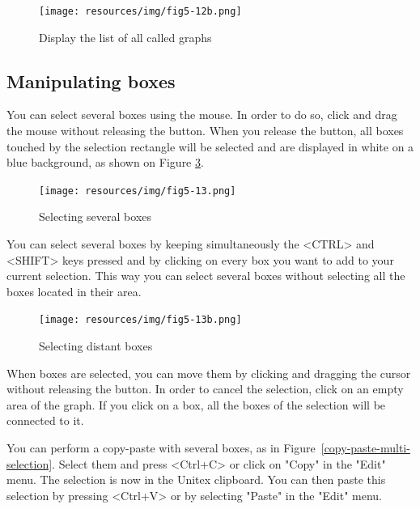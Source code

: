 \begin{figure}[!ht]
\begin{center}
\texttt{[image: resources/img/fig5-12b.png]}
\caption{Display the list of all called graphs\label{list-called-graphs}}
\end{center}
\end{figure}

\subsection{Manipulating boxes}
\label{boxes-selection}

You can select several boxes using the mouse. In order to do so, click and drag the
mouse without releasing the button. When you release the button, all boxes
touched by the selection rectangle will be selected and are displayed in
white on a blue background, as shown on Figure \ref{multi-selection}.

\begin{figure}[!ht]
\begin{center}
\texttt{[image: resources/img/fig5-13.png]}
\caption{Selecting several boxes\label{multi-selection}}
\end{center}
\end{figure}
\noindent You can select several boxes by keeping simultaneously the <CTRL> and <SHIFT> keys pressed and by clicking on every box you want to add to your current selection. This way you can select several boxes without selecting all the boxes located in their area.

\begin{figure}[!ht]
\begin{center}
\texttt{[image: resources/img/fig5-13b.png]}
\caption{Selecting distant boxes\label{multi-selection}}
\end{center}
\end{figure}
\bigskip
\noindent When boxes are selected, you can move them by clicking and
dragging the cursor without releasing the button. In order to cancel the selection, click on
an empty area of the graph. If you click on a box, all the boxes of the selection
will be connected to it.

\bigskip
{}
\noindent You can perform a copy-paste with several boxes, as in
Figure~\ref{copy-paste-multi-selection}. Select them and
press <Ctrl+C> or click on "Copy" in the "Edit" menu. The selection is now in the Unitex
clipboard. You can then paste this selection by pressing <Ctrl+V> or by selecting
"Paste" in the "Edit" menu.

